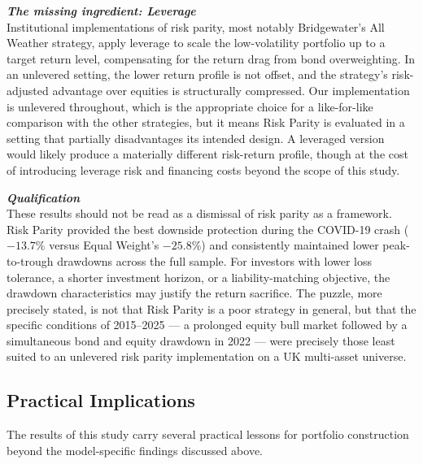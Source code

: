 \documentclass[a4paper,alpha-refs]{scr-contemporary}
\numberwithin{equation}{section}
\begin{document}
\noindent\textbf{\emph{The missing ingredient: Leverage}} \\
\indent Institutional implementations of risk parity, most notably Bridgewater's
All Weather strategy, apply leverage to scale the low-volatility portfolio up to a
target return level, compensating for the return drag from bond overweighting. \newline
\indent In an unlevered setting, the lower return profile is not offset, and the strategy's
risk-adjusted advantage over equities is structurally compressed. Our implementation
is unlevered throughout, which is the appropriate choice for a like-for-like comparison
with the other strategies, but it means Risk Parity is evaluated in a setting that
partially disadvantages its intended design. \newline 
\indent A leveraged version would likely produce a
materially different risk-return profile, though at the cost of introducing leverage risk
and financing costs beyond the scope of this study.

\noindent\textbf{\emph{Qualification}} \\
\indent These results should not be read as a dismissal of risk parity as a framework.
Risk Parity provided the best downside protection during the COVID-19 crash ($-13.7\%$
versus Equal Weight's $-25.8\%$) and consistently maintained lower peak-to-trough
drawdowns across the full sample. For investors with lower loss tolerance, a shorter
investment horizon, or a liability-matching objective, the drawdown characteristics may
justify the return sacrifice. The puzzle, more precisely stated, is not that Risk Parity
is a poor strategy in general, but that the specific conditions of 2015--2025 --- a
prolonged equity bull market followed by a simultaneous bond and equity drawdown in
2022 --- were precisely those least suited to an unlevered risk parity implementation
on a UK multi-asset universe.

\subsection{Practical Implications}
\label{sec:practical-implications}

\indent \indent The results of this study carry several practical lessons for
portfolio construction beyond the model-specific findings discussed above. \\
\end{document}
